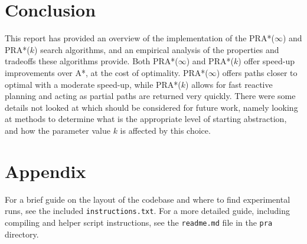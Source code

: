 \documentclass[letterpaper]{article} %
\begin{document}
\section{Conclusion}
This report has provided an overview of the implementation of the PRA*($\infty$) and PRA*($k$) search algorithms,
and an empirical analysis of the properties and tradeoffs these algorithms provide.
Both PRA*($\infty$) and PRA*($k$) offer speed-up improvements over A*, at the cost of optimality.
PRA*($\infty$) offers paths closer to optimal with a moderate speed-up,
while PRA*($k$) allows for fast reactive planning and acting as partial paths are returned very quickly.
There were some details not looked at which should be considered for future work, 
namely looking at methods to determine what is the appropriate level of starting abstraction,
and how the parameter value $k$ is affected by this choice.




\section*{Appendix}
For a brief guide on the layout of the codebase and where to find experimental runs, 
see the included \texttt{instructions.txt}.
For a more detailed guide, including compiling and helper script instructions,
see the \texttt{readme.md} file in the \texttt{pra} directory.
\end{document}
